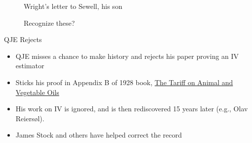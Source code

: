 \documentclass{beamer}
\begin{document}
\begin{frame}[plain]


  \centering
  \begin{overprint}%
    \begin{figure}[h]
      \caption{Wright's letter to Sewell, his son}
    \end{figure}
  \end{overprint}%

\end{frame}


\begin{frame}[plain]


  \centering
  \begin{overprint}%
    \begin{figure}[h]
      \caption{Recognize these?}
    \end{figure}
  \end{overprint}%

\end{frame}


\begin{frame}{QJE Rejects}

  \begin{itemize}
    \item QJE misses a chance to make history and rejects his paper proving an IV estimator
    \item Sticks his proof in Appendix B of 1928 book, \underline{The Tariff on Animal and Vegetable Oils}
    \item His work on IV is ignored, and is then rediscovered 15 years later (e.g., Olav Reiers\o l).
    \item James Stock and others have helped correct the record
  \end{itemize}

\end{frame}
\end{document}
